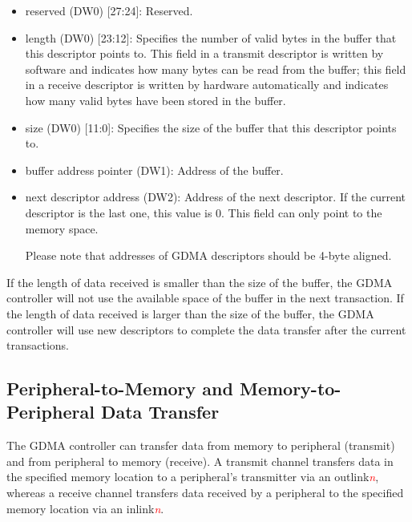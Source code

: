 \documentclass[main\_\_EN.tex]{subfiles}
\begin{document}
\begin{itemize}
    0: The received data does not have errors.\\
    1: The received data has errors.\\
    GDMA configures this bit in a receive descriptor based on the err\_eof provided by the peripheral when writing back the descriptor (Currently, no peripheral on \chipname{} supports the err\_eof flag).
    \item reserved (DW0) [27:24]: Reserved.
    \item length (DW0) [23:12]: Specifies the number of valid bytes in the buffer that this descriptor points to. This field in a transmit descriptor is written by software and indicates how many bytes can be read from the buffer; this field in a receive descriptor is written by hardware automatically and indicates how many valid bytes have been stored in the buffer.
    \item size (DW0) [11:0]: Specifies the size of the buffer that this descriptor points to.
    \item buffer address pointer (DW1): Address of the buffer.
    \item next descriptor address (DW2): Address of the next descriptor. If the current descriptor is the last one, this value is 0. This field can only point to the memory space.
        \begin{tiplisting}
            Please note that addresses of GDMA descriptors should be 4-byte aligned.
        \end{tiplisting}
\end{itemize}

If the length of data received is smaller than the size of the buffer, the GDMA controller will not use the available space of the buffer in the next transaction. If the length of data received is larger than the size of the buffer, the GDMA controller will use new descriptors to complete the data transfer after the current transactions.

\subsection{Peripheral-to-Memory and Memory-to-Peripheral Data Transfer}

The GDMA controller can transfer data from memory to peripheral (transmit) and from peripheral to memory (receive). A transmit channel transfers data in the specified memory location to a peripheral's transmitter via an outlink\textcolor{red}{\it{n}}, whereas a receive channel transfers data received by a peripheral to the specified memory location via an inlink\textcolor{red}{\it{n}}.
\end{document}
